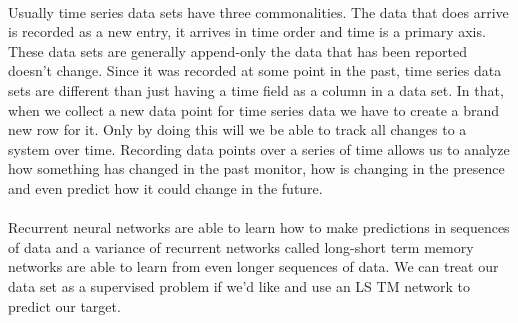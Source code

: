 \documentclass{article}
\begin{document}
    \paragraph{}
    Usually time series data sets have three commonalities. The data that does arrive is recorded as a new entry, it arrives in time order and time is a primary axis. These data sets are generally append-only the data that has been reported doesn't change. Since it was recorded at some point in the past, time series data sets are different than just having a time field as a column in a data set. In that, when we collect a new data point for time series data we have to create a brand new row for it. Only by doing this will we be able to track all changes to a system over time.  Recording data points over a series of time allows us to analyze how something has changed in the past monitor, how is changing in the presence and even predict how it could change in the future.
    \paragraph{} 
    Recurrent neural networks are able to learn how to make predictions in sequences of data and a variance of recurrent networks called long-short term memory networks are able to learn from even longer sequences of data. We can treat our data set as a supervised problem if we'd like and use an LS TM network to predict our target.
\end{document}
